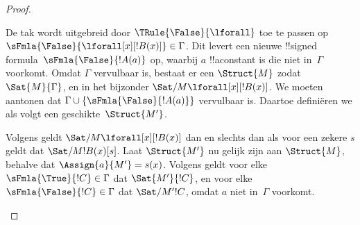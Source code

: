 \documentclass[../../../include/open-logic-section]{subfiles}
\begin{document}
\begin{proof}
\begin{enumerate}
{\item De tak wordt uitgebreid door $\TRule{\False}{\lforall}$ toe te
  passen op $\sFmla{\False}{\lforall[x][!B(x)]} \in \Gamma$. Dit
  levert een nieuwe !!{signed formula}~$\sFmla{\False}{!A(a)}$ op,
  waarbij $a$ !!a{constant} is die niet in~$\Gamma$ voorkomt. Omdat
  $\Gamma$ vervulbaar is, bestaat er een $\Struct{M}$ zodat
  $\Sat{M}{\Gamma}$, en in het bijzonder
  $\Sat/{M}{\lforall[x][!B(x)]}$. We moeten aantonen dat
  $\Gamma \cup \{\sFmla{\False}{!A(a)}\}$ vervulbaar is. Daartoe
  definiëren we als volgt een geschikte~$\Struct{M'}$.

  Volgens  geldt
  $\Sat/{M}{\lforall[x][!B(x)]}$ dan en slechts dan als voor een zekere
  $s$ geldt dat $\Sat/{M}{!B(x)}[s]$. Laat $\Struct{M'}$ nu gelijk zijn
  aan $\Struct{M}$, behalve dat $\Assign{a}{M'} = s(x)$. Volgens
   geldt voor elke
  $\sFmla{\True}{!C} \in \Gamma$ dat $\Sat{M'}{!C}$, en voor elke
  $\sFmla{\False}{!C} \in \Gamma$ dat $\Sat/{M'}{!C}$, omdat $a$ niet
  in~$\Gamma$ voorkomt.

}
\end{enumerate}
\end{proof}
\end{document}

